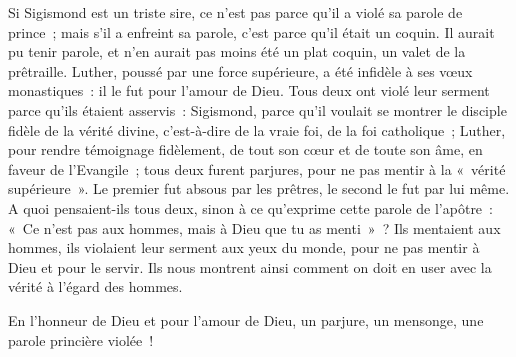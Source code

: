 \documentclass[french,twoside]{book} %
\begin{document}
Si Sigismond est un triste sire, ce n’est pas parce qu’il a violé sa parole de prince ; mais s’il a enfreint sa parole, c’est parce qu’il était un coquin. Il aurait pu  tenir parole, et n’en aurait pas moins été un plat coquin, un valet de la prêtraille. Luther, poussé par une force supérieure, a été infidèle à ses vœux monastiques : il le fut pour l’amour de Dieu. Tous deux ont violé leur serment parce qu’ils étaient asservis : Sigismond, parce qu’il voulait se montrer le disciple fidèle de la vérité divine, c’est-à-dire de la vraie foi, de la foi catholique ; Luther, pour rendre témoignage fidèlement, de tout son cœur et de toute son âme, en faveur de l’Evangile ; tous deux furent parjures, pour ne pas mentir à la « vérité supérieure ». Le premier fut absous par les prêtres, le second le fut par lui même. A quoi pensaient-ils tous deux, sinon à ce qu’exprime cette parole de l’apôtre : « Ce n’est pas aux hommes, mais à Dieu que tu as menti » ? Ils mentaient aux hommes, ils violaient leur serment aux yeux du monde, pour ne pas mentir à Dieu et pour le servir. Ils nous montrent ainsi comment on doit en user avec la vérité à l’égard des hommes.\par
En l’honneur de Dieu et pour l’amour de Dieu, un parjure, un mensonge, une parole princière violée !\par
\end{document}
